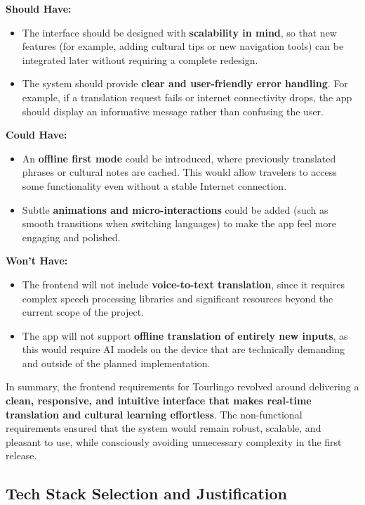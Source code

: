 \textbf{Should Have:}  
\begin{itemize}
    \item The interface should be designed with \textbf{scalability in mind}, so that new features (for example, adding cultural tips or new navigation tools) can be integrated later without requiring a complete redesign.  
    \item The system should provide \textbf{clear and user-friendly error handling}. For example, if a translation request fails or internet connectivity drops, the app should display an informative message rather than confusing the user.  
\end{itemize}

\textbf{Could Have:}  
\begin{itemize}
    \item An \textbf{offline first mode} could be introduced, where previously translated phrases or cultural notes are cached. This would allow travelers to access some functionality even without a stable Internet connection.  
    \item Subtle \textbf{animations and micro-interactions} could be added (such as smooth transitions when switching languages) to make the app feel more engaging and polished.  
\end{itemize}

\textbf{Won’t Have:}  
\begin{itemize}
    \item The frontend will not include \textbf{voice-to-text translation}, since it requires complex speech processing libraries and significant resources beyond the current scope of the project.  
    \item The app will not support \textbf{offline translation of entirely new inputs}, as this would require AI models on the device that are technically demanding and outside of the planned implementation.  
\end{itemize}

In summary, the frontend requirements for Tourlingo revolved around delivering a \textbf{clean, responsive, and intuitive interface that makes real-time translation and cultural learning effortless}. The non-functional requirements ensured that the system would remain robust, scalable, and pleasant to use, while consciously avoiding unnecessary complexity in the first release.


\subsection{Tech Stack Selection and Justification}

